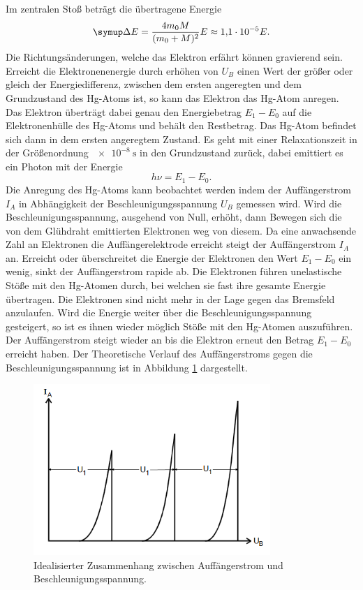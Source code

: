 Im zentralen Stoß beträgt die übertragene Energie
\begin{equation}
  \label{eq:betrag}
  \symup\Delta E = \frac{4 m_0 M}{(m_0 + M)^2} E \approx \num{1.1e-5} E  .
\end{equation}
Die Richtungsänderungen, welche das Elektron erfährt können gravierend sein.
Erreicht die Elektronenenergie durch erhöhen von $U_B$ einen Wert der größer oder gleich der Energiedifferenz, zwischen dem ersten angeregten und dem Grundzustand des Hg-Atoms ist, so kann das Elektron das Hg-Atom anregen.
Das Elektron überträgt dabei genau den Energiebetrag $E_1 - E_0$ auf die Elektronenhülle des Hg-Atoms und behält den Restbetrag.
Das Hg-Atom befindet sich dann in dem ersten angeregtem Zustand.
Es geht mit einer Relaxationszeit in der Größenordnung $\SI{e-8}{\second}$ in den Grundzustand zurück, dabei emittiert es ein Photon mit der Energie
\begin{equation}
  \label{eq:phot}
  h\nu = E_1 -E_0    .
\end{equation}
Die Anregung des Hg-Atoms kann beobachtet werden indem der Auffängerstrom $I_A$ in Abhängigkeit der Beschleunigungsspannung $U_B$ gemessen wird.
Wird die Beschleunigungsspannung, ausgehend von Null, erhöht, dann Bewegen sich die von dem Glühdraht emittierten Elektronen weg von diesem.
Da eine anwachsende Zahl an Elektronen die Auffängerelektrode erreicht steigt der Auffängerstrom $I_A$ an.
Erreicht oder überschreitet die Energie der Elektronen den Wert $E_1-E_0$ ein wenig, sinkt der Auffängerstrom rapide ab.
Die Elektronen führen unelastische Stöße mit den Hg-Atomen durch, bei welchen sie fast ihre gesamte Energie übertragen.
Die Elektronen sind nicht mehr in der Lage gegen das Bremsfeld anzulaufen.
Wird die Energie weiter über die Beschleunigungsspannung gesteigert, so ist es ihnen wieder möglich Stöße mit den Hg-Atomen auszuführen.
Der Auffängerstrom steigt wieder an bis die Elektron erneut den Betrag $E_1-E_0$ erreicht haben.
Der Theoretische Verlauf des Auffängerstroms gegen die Beschleunigungsspannung ist in Abbildung \ref{fig:besch} dargestellt.
\begin{figure}[H]
  \centering
  \includegraphics[width=0.8\textwidth]{content/theoriekurve.png}
  \caption{Idealisierter Zusammenhang zwischen Auffängerstrom und Beschleunigungsspannung\cite{v601}.}
  \label{fig:besch}
\end{figure}

